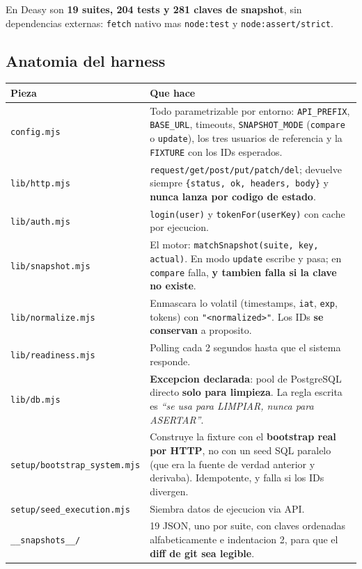 \documentclass[11pt,a4paper,oneside]{report}
\newcommand{\rt}[1]{\texttt{#1}}
\begin{document}
En Deasy son \textbf{19 suites, 204 tests y 281 claves de snapshot}, sin dependencias externas:
\rt{fetch} nativo mas \rt{node:test} y \rt{node:assert/strict}.

\subsection{Anatomia del harness}

\begin{center}
\footnotesize
\begin{tabularx}{\textwidth}{@{}P{3.0cm}L@{}}
\toprule
\textbf{Pieza} & \textbf{Que hace} \\
\midrule
\rt{config.mjs} &
  Todo parametrizable por entorno: \rt{API\_PREFIX}, \rt{BASE\_URL}, timeouts,
  \rt{SNAPSHOT\_MODE} (\rt{compare} o \rt{update}), los tres usuarios de referencia y la
  \rt{FIXTURE} con los IDs esperados. \\
\rt{lib/http.mjs} &
  \rt{request/get/post/put/patch/del}; devuelve siempre \rt{\{status, ok, headers, body\}} y
  \textbf{nunca lanza por codigo de estado}. \\
\rt{lib/auth.mjs} &
  \rt{login(user)} y \rt{tokenFor(userKey)} con cache por ejecucion. \\
\rt{lib/snapshot.mjs} &
  El motor: \rt{matchSnapshot(suite, key, actual)}. En modo \rt{update} escribe y pasa; en
  \rt{compare} falla, \textbf{y tambien falla si la clave no existe}. \\
\rt{lib/normalize.mjs} &
  Enmascara lo volatil (timestamps, \rt{iat}, \rt{exp}, tokens) con \rt{"<normalized>"}. Los IDs
  \textbf{se conservan} a proposito. \\
\rt{lib/readiness.mjs} &
  Polling cada 2 segundos hasta que el sistema responde. \\
\rt{lib/db.mjs} &
  \textbf{Excepcion declarada}: pool de PostgreSQL directo \textbf{solo para limpieza}. La regla
  escrita es \emph{``se usa para LIMPIAR, nunca para ASERTAR''}. \\
\rt{setup/bootstrap\_system.mjs} &
  Construye la fixture con el \textbf{bootstrap real por HTTP}, no con un seed SQL paralelo (que
  era la fuente de verdad anterior y derivaba). Idempotente, y falla si los IDs divergen. \\
\rt{setup/seed\_execution.mjs} &
  Siembra datos de ejecucion via API. \\
\rt{\_\_snapshots\_\_/} &
  19 JSON, uno por suite, con claves ordenadas alfabeticamente e indentacion 2, para que el
  \textbf{diff de git sea legible}. \\
\bottomrule
\end{tabularx}
\end{center}
\end{document}
